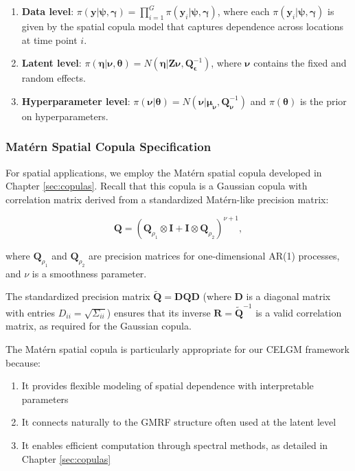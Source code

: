 \begin{enumerate}
    \item \textbf{Data level}: $\pi(\mathbf{y}|\boldsymbol{\psi}, \boldsymbol{\gamma}) = \prod_{i=1}^G \pi(\mathbf{y}_i|\boldsymbol{\psi}, \boldsymbol{\gamma})$, where each $\pi(\mathbf{y}_i|\boldsymbol{\psi}, \boldsymbol{\gamma})$ is given by the spatial copula model that captures dependence across locations at time point $i$.
    
    \item \textbf{Latent level}: $\pi(\boldsymbol{\eta}|\boldsymbol{\nu}, \boldsymbol{\theta}) = N(\boldsymbol{\eta}|\mathbf{Z}\boldsymbol{\nu}, \mathbf{Q}_{\boldsymbol{\epsilon}}^{-1})$, where $\boldsymbol{\nu}$ contains the fixed and random effects.
    
    \item \textbf{Hyperparameter level}: $\pi(\boldsymbol{\nu}|\boldsymbol{\theta}) = N(\boldsymbol{\nu}|\boldsymbol{\mu}_{\boldsymbol{\nu}}, \mathbf{Q}_{\boldsymbol{\nu}}^{-1})$ and $\pi(\boldsymbol{\theta})$ is the prior on hyperparameters.
\end{enumerate}

\subsubsection{Matérn Spatial Copula Specification}
For spatial applications, we employ the Matérn spatial copula developed in Chapter \ref{sec:copulas}. Recall that this copula is a Gaussian copula with correlation matrix derived from a standardized Matérn-like precision matrix:

\begin{equation}
    \mathbf{Q} = (\mathbf{Q}_{\rho_1} \otimes \mathbf{I} + \mathbf{I} \otimes \mathbf{Q}_{\rho_2})^{\nu+1},
\end{equation}

where $\mathbf{Q}_{\rho_1}$ and $\mathbf{Q}_{\rho_2}$ are precision matrices for one-dimensional AR(1) processes, and $\nu$ is a smoothness parameter.

The standardized precision matrix $\tilde{\mathbf{Q}} = \mathbf{D}\mathbf{Q}\mathbf{D}$ (where $\mathbf{D}$ is a diagonal matrix with entries $D_{ii} = \sqrt{\Sigma_{ii}}$) ensures that its inverse $\mathbf{R} = \tilde{\mathbf{Q}}^{-1}$ is a valid correlation matrix, as required for the Gaussian copula.

The Matérn spatial copula is particularly appropriate for our CELGM framework because:
\begin{enumerate}
    \item It provides flexible modeling of spatial dependence with interpretable parameters
    \item It connects naturally to the GMRF structure often used at the latent level
    \item It enables efficient computation through spectral methods, as detailed in Chapter \ref{sec:copulas}
\end{enumerate}

